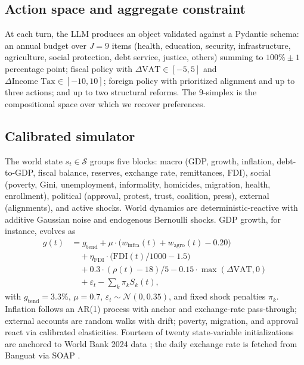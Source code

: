 \documentclass[conference]{IEEEtran}
\begin{document}
\subsection{Action space and aggregate constraint}

At each turn, the LLM produces an object validated against a Pydantic
schema: an annual budget over $J=9$ items (health, education,
security, infrastructure, agriculture, social protection, debt
service, justice, others) summing to $100\% \pm 1$ percentage point;
fiscal policy with $\Delta\text{VAT} \in [-5, 5]$ and
$\Delta\text{Income Tax} \in [-10, 10]$; foreign policy with
prioritized alignment and up to three actions; and up to two
structural reforms. The 9-simplex is the compositional space over
which we recover preferences.

\subsection{Calibrated simulator}

The world state $s_t \in \mathcal{S}$ groups five blocks: macro (GDP,
growth, inflation, debt-to-GDP, fiscal balance, reserves, exchange
rate, remittances, FDI), social (poverty, Gini, unemployment,
informality, homicides, migration, health, enrollment), political
(approval, protest, trust, coalition, press), external (alignments),
and active shocks. World dynamics are deterministic-reactive with
additive Gaussian noise and endogenous Bernoulli shocks. GDP growth,
for instance, evolves as
\begin{align}
g(t) &= g_{\text{tend}} + \mu \cdot \big(w_{\text{infra}}(t) + w_{\text{agro}}(t) - 0.20\big) \nonumber \\
     &\quad + \eta_{\text{FDI}} \cdot \big(\mathrm{FDI}(t)/1000 - 1.5\big) \nonumber \\
     &\quad + 0.3 \cdot (\rho(t) - 18)/5 - 0.15 \cdot \max(\Delta\text{VAT}, 0) \nonumber \\
     &\quad + \varepsilon_t - \sum_{k} \pi_k S_k(t),
\label{eq:gdp}
\end{align}
with $g_{\text{tend}}{=}3.3\%$, $\mu{=}0.7$, $\varepsilon_t \sim
\mathcal{N}(0, 0.35)$, and fixed shock penalties $\pi_k$. Inflation
follows an AR(1) process with anchor and exchange-rate pass-through;
external accounts are random walks with drift; poverty, migration, and
approval react via calibrated elasticities. Fourteen of twenty
state-variable initializations are anchored to World Bank 2024 data
\cite{wb_wdi}; the daily exchange rate is fetched from Banguat via
SOAP \cite{banguat}.
\end{document}
